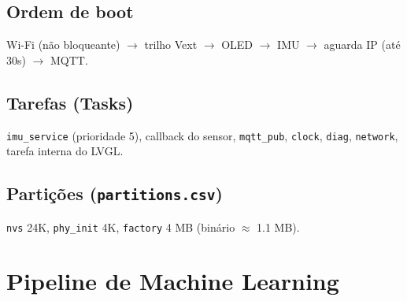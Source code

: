 \documentclass[11pt,a4paper]{article}
\begin{document}
\subsection{Ordem de boot}
Wi-Fi (não bloqueante) $\rightarrow$ trilho Vext $\rightarrow$ OLED $\rightarrow$ IMU $\rightarrow$ aguarda IP (até 30s) $\rightarrow$ MQTT.

\subsection{Tarefas (Tasks)}
\texttt{imu\_service} (prioridade 5), callback do sensor, \texttt{mqtt\_pub}, \texttt{clock}, \texttt{diag}, \texttt{network}, tarefa interna do LVGL.

\subsection{Partições (\texttt{partitions.csv})}
\texttt{nvs} 24K, \texttt{phy\_init} 4K, \texttt{factory} 4 MB (binário $\approx$ 1.1 MB).


\section{Pipeline de Machine Learning}
\end{document}
